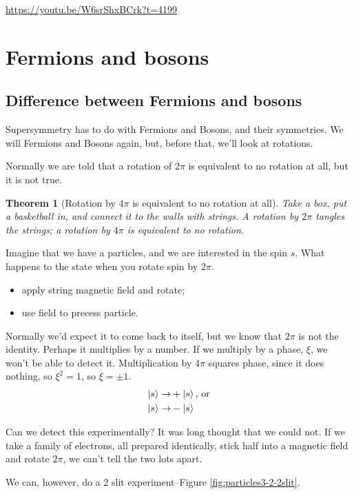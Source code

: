 \documentclass[]{article}
\newtheorem{thm}{Theorem}
\begin{document}
\url{https://youtu.be/W6srShxBCrk?t=4199}
	
\section{Fermions and bosons}

\subsection{Difference between Fermions and bosons}
Supersymmetry has to do with Fermions and Bosons, and their symmetries. We will Fermions and Bosons again, but, before that, we'll look at rotations.

Normally we are told that a rotation of $2\pi$ is equivalent to no rotation at all, but it is not true.

\begin{thm}[Rotation by $4\pi$ is equivalent to no rotation at all]
	Take a box, put a basketball in, and connect it to the walls with strings. A rotation by $2\pi$ tangles the strings; a rotation by $4\pi$ is equivalent to no rotation.
\end{thm}

Imagine that we have a particles, and we are interested in the spin $s$. What happens to the state when you rotate spin by $2\pi$.
\begin{itemize}
	\item apply string magnetic field and rotate;
	\item use field to precess particle.
\end{itemize}

Normally we'd expect it to come back to itself, but we know that $2\pi$ is not the identity. Perhaps it multiplies by a number. If we multiply by a phase, $\xi$, we won't be able to detect it. Multiplication by $4\pi$ squares phase, since it does nothing, so $\xi^2=1$, so $\xi=\pm1$.
\begin{align*}
	\ket{s} \rightarrow& +\ket{s} \text{, or}\\
	\ket{s} \rightarrow& -\ket{s}
\end{align*}

Can we detect this experimentally? It was long thought that we could not. If we take a family of electrons, all prepared identically, stick half into a magnetic field and rotate $2\pi$, we can't tell the two lots apart.

We can, however, do a 2 slit experiment\cite{aharonov1967observability}--Figure \ref{fig:particles3-2-2slit}.
\end{document}
